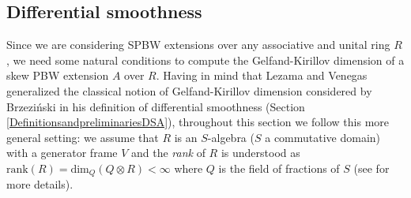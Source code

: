 \documentclass{amsart}
\newtheorem{proposition}[theorem]{Proposition}
\theoremstyle{definition}
\theoremstyle{remark}
\numberwithin{equation}{section}
\begin{document}




\subsection{Differential smoothness}\label{DifferentialsmoothnesSPBWEAD}

Since we are considering SPBW extensions over any associative and unital ring $R$, we need some natural conditions to compute the Gelfand-Kirillov dimension of a skew PBW extension $A$ over $R$. Having in mind that Lezama and Venegas \cite{LezamaVenegas2020} generalized the classical notion of Gelfand-Kirillov dimension \cite{GelfandKirillov1966, GelfandKirillov1966b} considered by Brzezi\'nski in his definition of differential smoothness (Section \ref{DefinitionsandpreliminariesDSA}), throughout this section we follow this more general setting: we assume that $R$ is an $S$-algebra ($S$ a commutative domain) with a generator frame $V$ and the {\em rank} of $R$ is understood as $\text{rank}(R)=\text{dim}_Q(Q \otimes R) < \infty$ where $Q$ is the field of fractions of $S$ (see \cite[Theorem 2.1]{LezamaVenegas2020} for more details).
\end{document}
